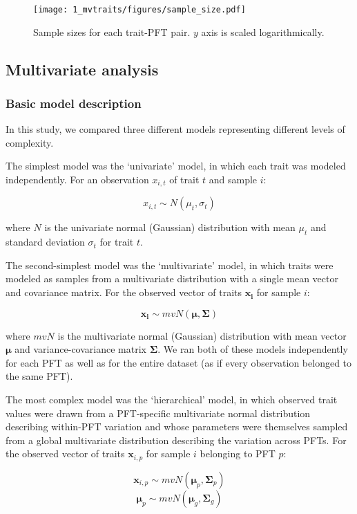\begin{figure}
  \centering
  \texttt{[image: 1\_mvtraits/figures/sample\_size.pdf]}
  \caption{%
    Sample sizes for each trait-PFT pair. $y$ axis is scaled logarithmically.
  }\label{fig:mvtraits-fig1}
\end{figure}


\subsection{Multivariate analysis}

\subsubsection{Basic model description}

In this study, we compared three different models representing different levels of complexity.

The simplest model was the `univariate' model, in which each trait was modeled independently.
For an observation $x_{i,t}$ of trait $t$ and sample $i$:

\[x_{i,t} \sim N(\mu_t, \sigma_t)\]

where $N$ is the univariate normal (Gaussian) distribution with mean $\mu_t$ and standard deviation $\sigma_t$ for trait $t$.

The second-simplest model was the `multivariate' model, in which traits were modeled as samples from a multivariate distribution with a single mean vector and covariance matrix.
For the observed vector of traits ${\mathbf{x_i}}$ for sample $i$:

\[\mathbf{x_i} \sim mvN(\mathbf{\mu}, \mathbf{\Sigma})\]

where $mvN$ is the multivariate normal (Gaussian) distribution with mean vector $\mathbf{\mu}$ and variance-covariance matrix $\mathbf{\Sigma}$.
We ran both of these models independently for each PFT as well as for the entire dataset (as if every observation belonged to the same PFT).

The most complex model was the `hierarchical' model, in which observed trait values were drawn from a PFT-specific multivariate normal distribution describing within-PFT variation and whose parameters were themselves sampled from a global multivariate distribution describing the variation across PFTs.
For the observed vector of traits $\mathbf{x}_{i,p}$ for sample $i$ belonging to PFT $p$:

\[\mathbf{x}_{i,p} \sim mvN(\mathbf{\mu}_p, \mathbf{\Sigma}_p)\]
\[\mathbf{\mu}_p \sim mvN(\mathbf{\mu}_g, \mathbf{\Sigma}_g)\]

